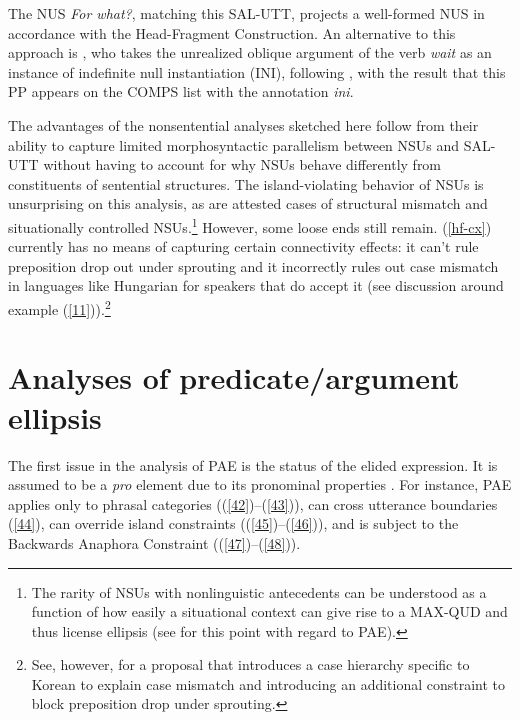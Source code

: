 {%
\z
%
The NUS \textit{For what?}, matching this SAL-UTT,
projects a well-formed NUS in accordance with the Head-Fragment Construction. An alternative to this approach is \citet{Kim2015}, who takes the unrealized oblique argument of the verb \textit{wait} as an instance of indefinite null instantiation (INI), following \citep[see][]{Ruppenhofer2014}, with the result that this PP appears on the COMPS list with the annotation \textit{ini}.

The advantages of the nonsentential analyses sketched here follow from their ability to capture limited morphosyntactic parallelism between NSUs and SAL-UTT without having to account for why NSUs behave differently from constituents of sentential structures. The island-violating behavior of NSUs is unsurprising on this analysis, as are attested cases of structural mismatch and situationally controlled NSUs.\footnote{The rarity of NSUs with nonlinguistic antecedents can be understood as a function of how easily a situational context can give rise to a MAX-QUD and thus license ellipsis (see \citealt{Miller2014b} for this point with regard to PAE).} However, some loose ends still remain. (\ref{hf-cx}) currently has no means of capturing certain connectivity effects: it can't rule preposition drop out under sprouting and it incorrectly rules out case mismatch in languages like Hungarian for speakers that do accept it (see discussion around example (\ref{11})).\footnote{See, however, \citet{Kim2015} for a proposal that introduces  a case hierarchy specific to Korean to explain case mismatch and introducing an additional constraint to block preposition drop under sprouting.}
%



\section{Analyses of predicate/argument ellipsis}
\label{sec-analyses-of-pred-ellipsis}
The first issue in the analysis of PAE is the status of the elided expression. It is assumed to be a \textit{pro} element due to its pronominal properties \citep[see][]{Lobeck1995, Lopez2000, Kim2006, Aelbrecht2015, Ginzburg2018}. For instance, PAE applies only to phrasal categories ((\ref{42})--(\ref{43})),
can cross utterance boundaries (\ref{44}), can override island constraints ((\ref{45})--(\ref{46})), and is subject to the Backwards Anaphora Constraint ((\ref{47})--(\ref{48})).

}
